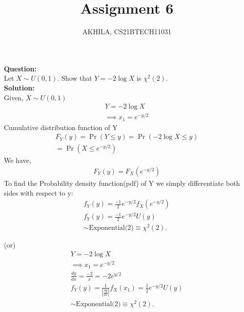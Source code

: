 \documentclass[journal,12pt,twocolumn]{IEEEtran}
\title{Assignment 6}
\author{AKHILA, CS21BTECH11031}
\newcommand{\question}{\noindent \textbf{Question: }}
\newcommand{\solution}{\noindent \textbf{Solution: }}
\providecommand{\brak}[1]{\ensuremath{\left(#1\right)}}
\providecommand{\pr}[1]{\ensuremath{\Pr\left(#1\right)}}
\begin{document}
\maketitle
\question\\
Let $X \sim U\brak{0,1}$. Show that $Y= -2\log{X}$ is $\chi^2(2)$.\\

\solution\\

Given,  $X \sim U\brak{0,1}$
\begin{align*}
Y= -2\log{X}\\
\implies x_1 = e^{-y/2}
\end{align*}
Cumulative distribution function of Y
\begin{align*}
F_Y(y) = \pr{Y\leq y} = \pr{-2\log{X}\leq y}\\ = \pr{X\leq e^{-y/2}}
\end{align*}
We have,
\begin{align*}
F_Y(y) = F_X(e^{-y/2})
\end{align*}
To find the Probability density function(pdf) of Y we simply differentiate both sides with respect to y:
\begin{align*}
f_Y(y)=\frac{-1}{2}e^{-y/2}f_X( e^{-y/2})\\
f_Y(y)=\frac{-1}{2}e^{-y/2}U(y)\\
\sim \text{Exponential(2)} \equiv \chi^2(2).
\end{align*}

\center (or)
\begin{align*}
Y= -2\log{X}\\
\implies x_1 = e^{-y/2}\\
\frac{dy}{dx}=\frac{-2}{x}=-2e^{y/2}\\
f_Y(y)=\frac{1}{|\frac{dy}{dx}|}f_X(x_1)=\frac{1}{2}e^{-y/2}U(y)\\
\sim \text{Exponential(2)} \equiv \chi^2(2).
\end{align*}
\end{document}
